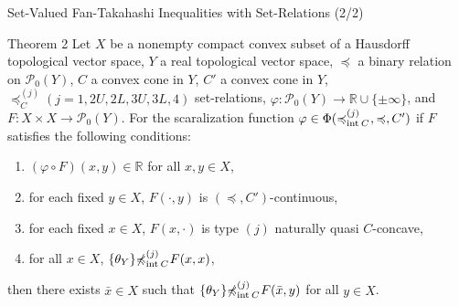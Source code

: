 \documentclass[aspectratio=169, dvipdfmx, 11pt]{beamer}
\newcommand{\rnum}{\mathbb{R}}
\newcommand{\Interior}[1]{\text{\rm int\:${#1}$}} %
\newcommand{\pow}[1]{\mathcal{P}_{0}(#1)}
\newcommand{\setrel}[2]{\preccurlyeq^{(#1)}_{#2}\!}
\newcommand{\notsetrel}[2]{{\not\preccurlyeq}^{(#1)}_{#2}\!}
\begin{document}
\begin{frame}{Set-Valued Fan-Takahashi Inequalities with Set-Relations (2/2)}
  \begin{block}{Theorem 2}
    Let $X$ be a nonempty compact convex subset of a Hausdorff topological vector space,
    $Y$ a real topological vector space, $\preccurlyeq$ a binary relation on $\pow{Y}$,
    $C$ a convex cone in $Y$, $C'$ a convex cone in $Y$,
    $\setrel{j}{C} (j= 1, 2U, 2L, 3U, 3L, 4)$ set-relations,
    $\varphi\colon \pow{Y} \to \rnum \cup \{\pm \infty\}$,
    and $F\colon X \times X \to \pow{Y}$.
    For the scaralization function $\varphi \in \Phi(\setrel{j}{\Interior{C}}\:, \preccurlyeq, C')$
    if $F$ satisfies the following conditions:
    \begin{enumerate}
      \item $(\varphi \circ F)(x,y) \in \rnum$ for all $x,y \in X$,
      \item for each fixed $y \in X$, $F(\cdot,y)$ is $(\preccurlyeq, C')$-continuous,
      \item for each fixed $x \in X$, $F(x,\cdot)$ is type $(j)$ naturally quasi $C$-concave,
      \item for all $x \in X$, $\{\theta_Y\} \notsetrel{j}{\Interior{C}}\: F(x,x) $,
    \end{enumerate}
    then there exists $\bar{x} \in X$ such that $\{\theta_Y\} \notsetrel{j}{\Interior{C}}\: F(\bar{x},y)$
    for all $y \in X$.
  \end{block}
\end{frame}


\end{document}
